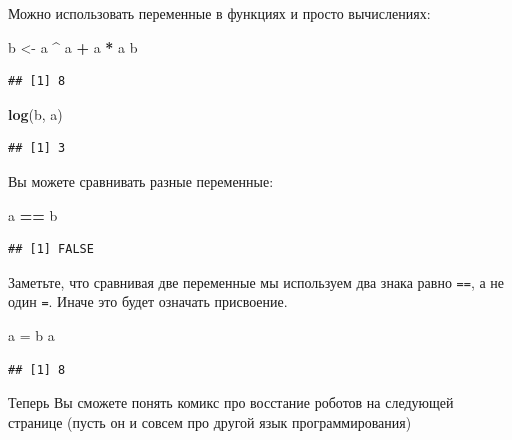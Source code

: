 \documentclass[]{book}
\newenvironment{Shaded}{\begin{snugshade}}{\end{snugshade}}
\newcommand{\KeywordTok}[1]{\textcolor[rgb]{0.13,0.29,0.53}{\textbf{#1}}}
\newcommand{\StringTok}[1]{\textcolor[rgb]{0.31,0.60,0.02}{#1}}
\newcommand{\OperatorTok}[1]{\textcolor[rgb]{0.81,0.36,0.00}{\textbf{#1}}}
\newcommand{\NormalTok}[1]{#1}
\begin{document}
Можно использовать переменные в функциях и просто вычислениях:

\begin{Shaded}
\begin{Highlighting}[]
\NormalTok{b <-}\StringTok{ }\NormalTok{a }\OperatorTok{^}\StringTok{ }\NormalTok{a }\OperatorTok{+}\StringTok{ }\NormalTok{a }\OperatorTok{*}\StringTok{ }\NormalTok{a}
\NormalTok{b}
\end{Highlighting}
\end{Shaded}

\begin{verbatim}
## [1] 8
\end{verbatim}

\begin{Shaded}
\begin{Highlighting}[]
\KeywordTok{log}\NormalTok{(b, a)}
\end{Highlighting}
\end{Shaded}

\begin{verbatim}
## [1] 3
\end{verbatim}

Вы можете сравнивать разные переменные:

\begin{Shaded}
\begin{Highlighting}[]
\NormalTok{a }\OperatorTok{==}\StringTok{ }\NormalTok{b}
\end{Highlighting}
\end{Shaded}

\begin{verbatim}
## [1] FALSE
\end{verbatim}

Заметьте, что сравнивая две переменные мы используем два знака равно
\texttt{==}, а не один \texttt{=}. Иначе это будет означать присвоение.

\begin{Shaded}
\begin{Highlighting}[]
\NormalTok{a =}\StringTok{ }\NormalTok{b}
\NormalTok{a}
\end{Highlighting}
\end{Shaded}

\begin{verbatim}
## [1] 8
\end{verbatim}

Теперь Вы сможете понять комикс про восстание роботов на следующей
странице (пусть он и совсем про другой язык программирования)
\end{document}
